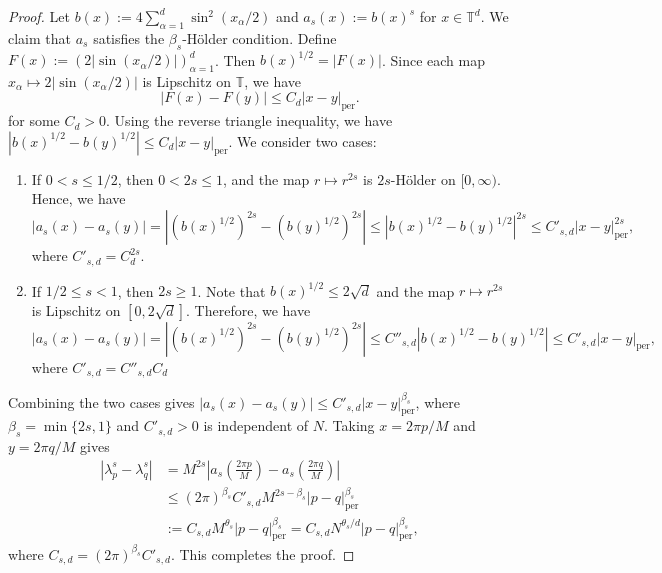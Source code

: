 \documentclass[10pt,reqno]{article}
\numberwithin{equation}{section}
\theoremstyle{plain}
\theoremstyle{definition}
\begin{document}
\begin{proof}
Let $b(x):=4\sum_{\alpha=1}^d \sin^2(x_\alpha/2)$ and $a_s(x):=b(x)^s$ for  $x\in\mathbb T^d$. We claim that \(a_s\) satisfies the \(\beta_s\)-H\"older condition. Define $F(x):=(2|\sin(x_\alpha/2)|)_{\alpha=1}^d$. Then $b(x)^{1/2}=|F(x)|$.  Since each map \(x_\alpha\mapsto 2|\sin(x_\alpha/2)|\) is Lipschitz on \(\mathbb T\), we have
\begin{equation}
|F(x)-F(y)|\le C_d |x-y|_{\operatorname{per}}.
\end{equation}
for some $C_d > 0$. Using the reverse triangle inequality, we have $|b(x)^{1/2} - b(y)^{1/2}| \le C_d |x-y|_{\operatorname{per}}$. We consider two cases:
\begin{enumerate}
\item If \(0<s\le 1/2\), then \(0<2s\le 1\), and the map \(r\mapsto r^{2s}\) is \(2s\)-Hölder on \([0,\infty)\). Hence, we have
\begin{equation}
|a_s(x)-a_s(y)| = |(b(x)^{1/2})^{2s} - (b(y)^{1/2})^{2s}| \le |b(x)^{1/2}-b(y)^{1/2}|^{2s} \le C'_{s,d}|x-y|_{\operatorname{per}}^{2s},
\end{equation}
where $C'_{s,d} = C^{2s}_d$.

\item If \(1/2\le s<1\), then \(2s\ge 1\). Note that $b(x)^{1/2}\le 2\sqrt d$ and the map \(r\mapsto r^{2s}\) is Lipschitz on \([0,2\sqrt d]\). Therefore, we have
\begin{equation}
|a_s(x)-a_s(y)| = |(b(x)^{1/2})^{2s} - (b(y)^{1/2})^{2s}| \le C''_{s,d}|b(x)^{1/2}-b(y)^{1/2}| \le C'_{s,d}|x-y|_{\operatorname{per}},
\end{equation}
where $C'_{s,d} = C''_{s,d} C_d$
\end{enumerate}
Combining the two cases gives $|a_s(x)-a_s(y)| \le C'_{s,d}|x-y|_{\operatorname{per}}^{\beta_s}$, where $\beta_s=\min\{2s,1\}$ and $ C'_{s,d} > 0$ is independent of $N$. Taking \(x=2\pi p/M\) and \(y=2\pi q/M\) gives
\begin{align}
|\lambda_p^s-\lambda_q^s| &= M^{2s}\left|a_s\!\left(\frac{2\pi p}{M}\right)-a_s\!\left(\frac{2\pi q}{M}\right)\right|  \\ & \le (2\pi)^{\beta_s} C'_{s,d}M^{2s-\beta_s}|p-q|_{\mathrm{per}}^{\beta_s} \\ & := C_{s,d}M^{\theta_s}|p-q|_{\mathrm{per}}^{\beta_s} = C_{s,d}N^{\theta_s/d}|p-q|_{\mathrm{per}}^{\beta_s},
\end{align}
where $C_{s,d} = (2\pi)^{\beta_s} C'_{s,d}$. This completes the proof.
\end{proof}
\end{document}
